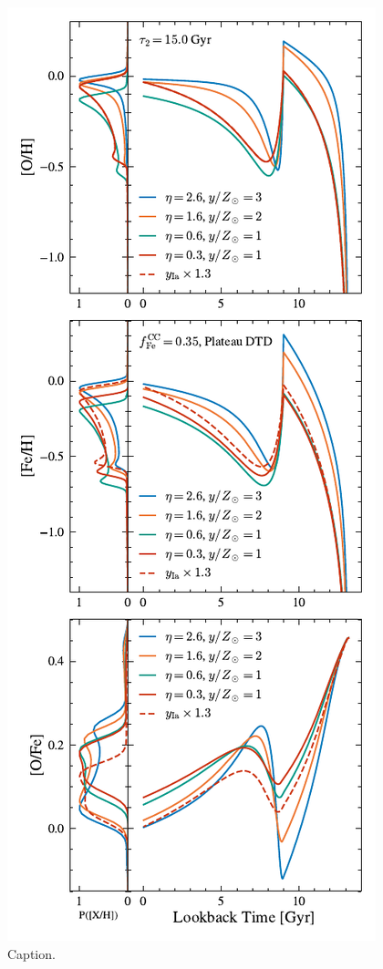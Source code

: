 \documentclass[twocolumn,twocolappendix,linenumbers]{aastex631}
\begin{document}
\begin{figure}
    \centering
    \includegraphics{figures/yield_outflow.pdf}
    \caption{Caption.}
    \label{fig:onezone-dtd}
\end{figure}
\end{document}
